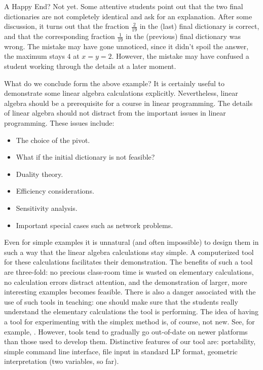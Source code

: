 \documentclass[ukenglish]{nik}
\begin{document}
A Happy End? Not yet. Some attentive students point out that the two final dictionaries
are not completely identical and ask for an explanation. After some discussion, it turns
out that the fraction $\frac{2}{19}$ in the (last) final dictionary is correct,
and that the corresponding fraction $\frac{1}{19}$ in the (previous) final dictionary was wrong.
The mistake may have gone unnoticed, since it didn't spoil the answer, the maximum stays
$4$ at $x=y=2$. However, the mistake may have confused a student working through the details at a later moment.

What do we conclude form the above example? It is certainly useful to demonstrate some
linear algebra calculations explicitly. Nevertheless, linear algebra should be a prerequisite for a course
in linear programming. The details of linear algebra should not distract from the important
issues in linear programming. These issues include:
\begin{itemize}
\item The choice of the pivot.
\item What if the initial dictionary is not feasible?
\item Duality theory.
\item Efficiency considerations.
\item Sensitivity analysis.
\item Important special cases such as network problems.
\end{itemize}
Even for simple examples it is unnatural (and often impossible)
to design them in such a way that the linear algebra calculations stay simple.
A computerized tool for these calculations facilitates their demonstration.
The benefits of such a tool are three-fold: no precious class-room time is wasted
on elementary calculations, no calculation errors distract attention, and
the demonstration of larger, more interesting examples becomes feasible.
There is also a danger associated with the use of such tools in teaching: 
one should make sure that the students really understand the elementary
calculations the tool is performing. The idea of having a tool
for experimenting with the simplex method is, of course, not new. 
See, for example, \cite{SimplexPivotTool, AdvancedPivotTool}.
However, tools tend to gradually go out-of-date on newer platforms
than those used to develop them. Distinctive features of our tool are: 
portability, 
simple command line interface, 
file input in standard LP format,
geometric interpretation (two variables, so far).
\end{document}
